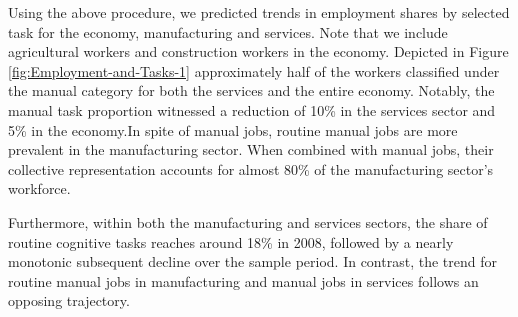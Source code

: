 \begin{onehalfspace}
Using the above procedure, we predicted trends in employment shares
by selected task for the economy, manufacturing and services. Note
that we include agricultural workers and construction workers in the
economy. Depicted in Figure \ref{fig:Employment-and-Tasks-1} approximately
half of the workers classified under the manual category for both
the services and the entire economy. Notably, the manual task proportion
witnessed a reduction of 10\% in the services sector and 5\% in the
economy.In spite of manual jobs, routine manual jobs are more prevalent
in the manufacturing sector. When combined with manual jobs, their
collective representation accounts for almost 80\% of the manufacturing
sector's workforce.

Furthermore, within both the manufacturing and services sectors, the
share of routine cognitive tasks reaches around 18\% in 2008, followed
by a nearly monotonic subsequent decline over the sample period. In
contrast, the trend for routine manual jobs in manufacturing and manual
jobs in services follows an opposing trajectory.
\end{onehalfspace}
